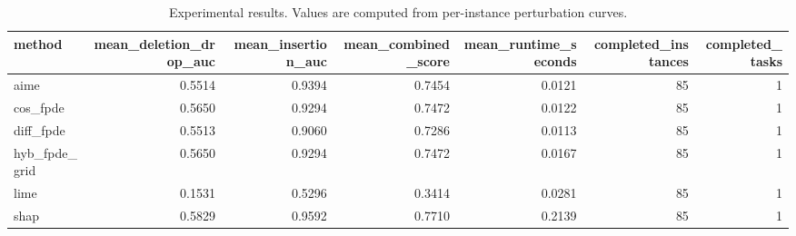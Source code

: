 \begin{table}[t]
\caption{Experimental results. Values are computed from per-instance perturbation curves.}
\label{tab:main_results_computed}
\centering
\begin{tabular}{lrrrrrr}
\toprule
method & mean\_deletion\_drop\_auc & mean\_insertion\_auc & mean\_combined\_score & mean\_runtime\_seconds & completed\_instances & completed\_tasks \\
\midrule
aime & 0.5514 & 0.9394 & 0.7454 & 0.0121 & 85 & 1 \\
cos\_fpde & 0.5650 & 0.9294 & 0.7472 & 0.0122 & 85 & 1 \\
diff\_fpde & 0.5513 & 0.9060 & 0.7286 & 0.0113 & 85 & 1 \\
hyb\_fpde\_grid & 0.5650 & 0.9294 & 0.7472 & 0.0167 & 85 & 1 \\
lime & 0.1531 & 0.5296 & 0.3414 & 0.0281 & 85 & 1 \\
shap & 0.5829 & 0.9592 & 0.7710 & 0.2139 & 85 & 1 \\
\bottomrule
\end{tabular}

\end{table}
